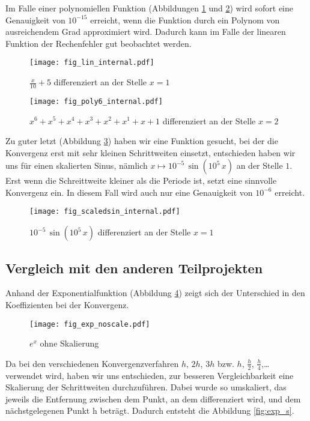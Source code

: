 \documentclass{scrartcl}
\begin{document}
Im Falle einer polynomiellen Funktion (Abbildungen \ref{fig:lin} und \ref{fig:poly6}) wird sofort eine Genauigkeit von \(10^{-15}\) erreicht, wenn die Funktion durch ein Polynom von ausreichendem Grad approximiert wird.
Dadurch kann im Falle der linearen Funktion der Rechenfehler gut beobachtet werden.


\begin{figure}[!htb]
\centering
\texttt{[image: fig\_lin\_internal.pdf]}
\caption{\(\frac x {10} + 5\) differenziert an der Stelle \(x=1\)}
\label{fig:lin}
\end{figure}

\begin{figure}[!htb]
\centering
\texttt{[image: fig\_poly6\_internal.pdf]}
\caption{\(x^6+x^5+x^4+x^3+x^2+x^1+x+1\) differenziert an der Stelle \(x=2\)}
\label{fig:poly6}
\end{figure}


Zu guter letzt (Abbildung \ref{fig:scaledsin})
haben wir eine Funktion gesucht, bei der die Konvergenz erst mit sehr kleinen
Schrittweiten einsetzt, entschieden haben wir uns für einen skalierten Sinus,
nämlich \(x \mapsto 10^{-5}\, \sin(10^5\, x)\) an der Stelle \(1\).
Erst wenn die Schreittweite kleiner als die Periode ist, setzt eine sinnvolle Konvergenz ein. In diesem Fall wird auch nur eine Genauigkeit von \(10^{-6}\) erreicht.


\begin{figure}[!htb]
\centering
\texttt{[image: fig\_scaledsin\_internal.pdf]}
\caption{\(10^{-5}\, \sin(10^5\, x)\) differenziert an der Stelle \(x=1\)}
\label{fig:scaledsin}
\end{figure}


\subsection{Vergleich mit den anderen Teilprojekten}

Anhand der Exponentialfunktion (Abbildung \ref{fig:exp_ns}) zeigt sich der Unterschied in den Koeffizienten bei der Konvergenz.

\begin{figure}[!htb]
\centering
\texttt{[image: fig\_exp\_noscale.pdf]}
\caption{\(e^x\) ohne Skalierung}
\label{fig:exp_ns}
\end{figure}

Da bei den verschiedenen Konvergenzverfahren \(h\), \(2h\), \(3h\) bzw. \(h\), \(\frac h 2\), \(\frac h 4\),\dots
verwendet wird, haben wir uns entschieden, zur besseren Vergleichbarkeit eine Skalierung der Schrittweiten durchzuführen.
Dabei wurde so umskaliert, das jeweils die Entfernung zwischen dem Punkt, an dem differenziert wird, und dem nächstgelegenen Punkt h beträgt.
Dadurch entsteht die Abbildung \ref{fig:exp_s}.
\end{document}
